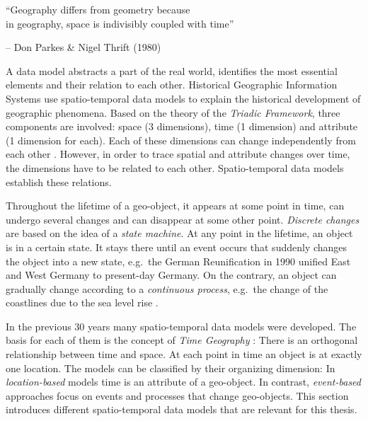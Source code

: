 \begin{quoteit}
  ``Geography differs from geometry because \\
  in geography, space is indivisibly coupled with time''
\end{quoteit}
\hfill -- Don Parkes \& Nigel Thrift (1980)

A data model abstracts a part of the real world, identifies the most essential elements and their relation to each other. Historical Geographic Information Systems use spatio-temporal data models to explain the historical development of geographic phenomena. Based on the theory of the \emph{Triadic Framework}, three components are involved: space (3 dimensions), time (1 dimension) and attribute (1 dimension for each). Each of these dimensions can change independently from each other
\cite[p. 53]{ott2001time}.
However, in order to trace spatial and attribute changes over time, the dimensions have to be related to each other. Spatio-temporal data models establish these relations.

Throughout the lifetime of a geo-object, it appears at some point in time, can undergo several changes and can disappear at some other point. \emph{Discrete changes} are based on the idea of a \emph{state machine}. At any point in the lifetime, an object is in a certain state. It stays there until an event occurs that suddenly changes the object into a new state, e.g.\ the German Reunification in 1990 unified East and West Germany to present-day Germany. On the contrary, an object can gradually change according to a \emph{continuous process}, e.g.\ the change of the coastlines due to the sea level rise
\cite{peuquet99}.

In the previous 30 years many spatio-temporal data models were developed. The basis for each of them is the concept of \emph{Time Geography}
\cite{haegerstrand1970}:
There is an orthogonal relationship between time and space. At each point in time an object is at exactly one location. The models can be classified by their organizing dimension: In \emph{location-based} models time is an attribute of a geo-object. In contrast, \emph{event-based} approaches focus on events and processes that change geo-objects. This section introduces different spatio-temporal data models that are relevant for this thesis.


